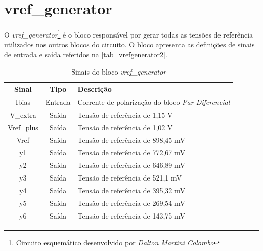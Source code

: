 \renewcommand{\NomeBloco}{\textit{vref\_generator}}
\renewcommand{\NomeBlocoNoUnderline}{vrefgenerator}
\renewcommand{\NomePTab}{tab_\NomeBlocoNoUnderline}
\renewcommand{\NomeSTab}{tab_\NomeBlocoNoUnderline2}
\renewcommand{\NomePFig}{fig_\NomeBlocoNoUnderline}
\renewcommand{\NomeSFig}{fig_\NomeBlocoNoUnderline2}
\renewcommand{\NomeTTab}{tab_\NomeBlocoNoUnderline3}
\renewcommand{\NomeQTab}{tab_\NomeBlocoNoUnderline4}

\section{vref\_generator}

O \textit{\NomeBloco}\footnote{Circuito esquemático desenvolvido por \textit{Dalton Martini Colombo}} \'e o bloco respons\'avel por gerar todas as tensões de refer\^encia utilizados nos outros blocos do circuito. O bloco apresenta as definições de sinais de entrada e sa\'ida referidos na \autoref{\NomeSTab}.

\begin{table}[!h]
\caption{Sinais do bloco \NomeBloco}
\label{\NomeSTab}
\centering
\begin{tabular}{ccl}

    \toprule
    Sinal & Tipo    & Descrição      \\
    \midrule \midrule
    Ibias   & Entrada   & Corrente de polarização do bloco \textit{Par Diferencial} \\
    \midrule
    V\_extra   & Saída   & Tensão de refer\^encia de 1,15 V \\
    \midrule
    Vref\_plus   & Saída   & Tensão de refer\^encia de 1,02 V \\
    \midrule
    Vref   & Saída   & Tensão de refer\^encia de 898,45 mV \\
    \midrule
    y1   & Saída   & Tensão de refer\^encia de 772,67 mV \\
    \midrule
    y2   & Saída   & Tensão de refer\^encia de 646,89 mV \\
    \midrule
    y3   & Saída   & Tensão de refer\^encia de 521,1 mV \\
    \midrule
    y4  & Saída   & Tensão de refer\^encia de 395,32 mV  \\
    \midrule
    y5   & Saída   & Tensão de refer\^encia de 269,54 mV \\
    \midrule
    y6   & Saída   & Tensão de refer\^encia de 143,75 mV \\
    \bottomrule
\end{tabular}
\end{table}

